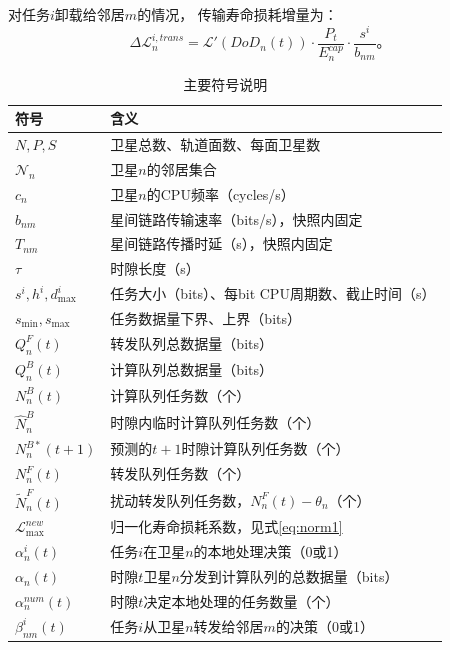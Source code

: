 \documentclass[a4paper,11pt]{article}
\begin{document}
对任务$i$卸载给邻居$m$的情况，
传输寿命损耗增量为：
\begin{equation}
    \Delta\mathcal{L}^{i,trans}_n =
    \mathcal{L}'(DoD_n(t)) \cdot
    \frac{P_t}{E^{cap}_n} \cdot
    \frac{s^i}{b_{nm}}。
    \label{eq:delta_L_trans}
\end{equation}

\begin{table}[t]
\centering
\caption{主要符号说明}
\label{tab:notation}
\begin{tabular}{ll}
\toprule
\textbf{符号} & \textbf{含义} \\
\midrule
$N, P, S$ & 卫星总数、轨道面数、每面卫星数 \\
$\mathcal{N}_n$ & 卫星$n$的邻居集合 \\
$c_n$ & 卫星$n$的CPU频率（cycles/s） \\
$b_{nm}$ & 星间链路传输速率（bits/s），快照内固定 \\
$T_{nm}$ & 星间链路传播时延（s），快照内固定 \\
$\tau$ & 时隙长度（s） \\
$s^i, h^i, d^i_{\max}$ & 任务大小（bits）、每bit CPU周期数、截止时间（s） \\
$s_{\min}, s_{\max}$ & 任务数据量下界、上界（bits） \\
$Q^F_n(t)$ & 转发队列总数据量（bits） \\
$Q^B_n(t)$ & 计算队列总数据量（bits） \\
$N^B_n(t)$ & 计算队列任务数（个） \\
$\hat{N}^B_n$ & 时隙内临时计算队列任务数（个） \\
$N^{B*}_n(t+1)$ & 预测的$t+1$时隙计算队列任务数（个） \\
$N^F_n(t)$ & 转发队列任务数（个） \\
$\tilde{N}^F_n(t)$ & 扰动转发队列任务数，$N^F_n(t) - \theta_n$（个） \\
$\mathcal{L}^{new}_{\max}$ & 归一化寿命损耗系数，见式\eqref{eq:norm1} \\
$\alpha^i_n(t)$ & 任务$i$在卫星$n$的本地处理决策（0或1） \\
$\alpha_n(t)$ & 时隙$t$卫星$n$分发到计算队列的总数据量（bits） \\
$\alpha^{num}_n(t)$ & 时隙$t$决定本地处理的任务数量（个） \\
$\beta^i_{nm}(t)$ & 任务$i$从卫星$n$转发给邻居$m$的决策（0或1） \\

\end{tabular}
\end{table}
\end{document}
